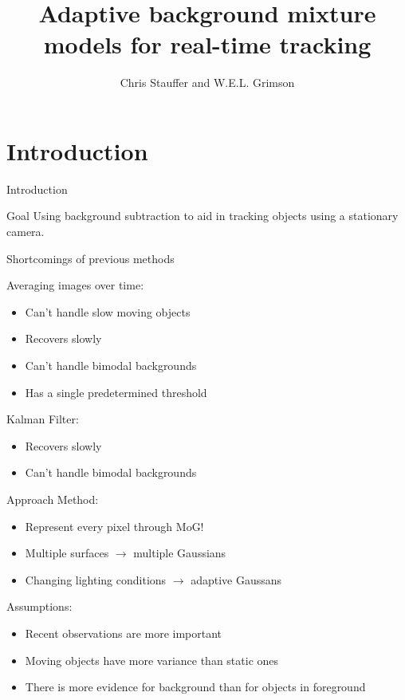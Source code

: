 \documentclass{beamer}
\title[Adaptive background mixture models for real-time tracking]
{Adaptive background mixture models for real-time tracking}
\author[Chris Stauffer and W.E.L. Grimson] %
{Chris Stauffer and W.E.L. Grimson}
\institute[University of Amsterdam] %
{
  Chiel Kooijman and Auke Wiggers \\
  Computer Vision  \\
  Artificial Intelligence \\
  Faculty of Science (FNWI) \\
  University of Amsterdam
}
\begin{document}
\maketitle

\section{Introduction}
\begin{frame}{Introduction}
\begin{block}{Goal}
Using background subtraction to aid in tracking objects using a stationary camera.
\end{block}

\end{frame}

\begin{frame}{Shortcomings of previous methods}

Averaging images over time:
\begin{itemize}
\item Can't handle slow moving objects
\item Recovers slowly
\item Can't handle bimodal backgrounds
\item Has a single predetermined threshold
\end{itemize}

Kalman Filter:
\begin{itemize}
\item Recovers slowly
\item Can't handle bimodal backgrounds
\end{itemize}
\end{frame}

\begin{frame}{Approach}
Method:
\begin{itemize}
\item Represent every pixel through MoG!
\item Multiple surfaces $\rightarrow$ multiple Gaussians
\item Changing lighting conditions $\rightarrow$ adaptive Gaussans
\end{itemize}

Assumptions:
\begin{itemize}
\item Recent observations are more important
\item Moving objects have more variance than static ones
\item There is more evidence for background than for objects in foreground
\end{itemize}

\end{frame}
\end{document}
